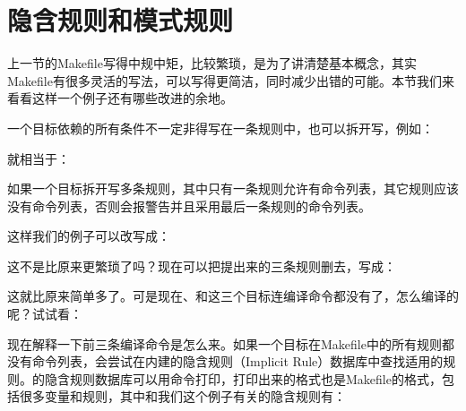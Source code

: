 


\section{隐含规则和模式规则}
%
上一节的Makefile写得中规中矩，比较繁琐，是为了讲清楚基本概念，其实Makefile有很多灵活的写法，可以写得更简洁，同时减少出错的可能。本节我们来看看这样一个例子还有哪些改进的余地。



一个目标依赖的所有条件不一定非得写在一条规则中，也可以拆开写，例如：




就相当于：




如果一个目标拆开写多条规则，其中只有一条规则允许有命令列表，其它规则应该没有命令列表，否则会报警告并且采用最后一条规则的命令列表。



这样我们的例子可以改写成：




这不是比原来更繁琐了吗？现在可以把提出来的三条规则删去，写成：




这就比原来简单多了。可是现在、和这三个目标连编译命令都没有了，怎么编译的呢？试试看：




现在解释一下前三条编译命令是怎么来。如果一个目标在Makefile中的所有规则都没有命令列表，会尝试在内建的隐含规则（Implicit Rule）数据库中查找适用的规则。的隐含规则数据库可以用命令打印，打印出来的格式也是Makefile的格式，包括很多变量和规则，其中和我们这个例子有关的隐含规则有：




